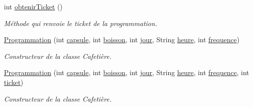 \begin{DoxyCompactItemize}
int \hyperlink{classcom_1_1example_1_1ekawa_1_1_programmation_a63e8701af99c5bd974e028ba53209887}{obtenir\+Ticket} ()
\begin{DoxyCompactList}\small\item\em Méthode qui renvoie le ticket de la programmation. \end{DoxyCompactList}\item 
\hyperlink{classcom_1_1example_1_1ekawa_1_1_programmation_a9119f0bd9f104d0fbccdff1ab1f0eb64}{Programmation} (int \hyperlink{classcom_1_1example_1_1ekawa_1_1_programmation_a97573a66f9b2821a7445c69f346a5298}{capsule}, int \hyperlink{classcom_1_1example_1_1ekawa_1_1_programmation_a625a85ed4d0b16f52382fd458e0e5657}{boisson}, int \hyperlink{classcom_1_1example_1_1ekawa_1_1_programmation_a96605063cb4177fa382b1ce2388f544f}{jour}, String \hyperlink{classcom_1_1example_1_1ekawa_1_1_programmation_abfff674f6cd5f76ea4b8c37e8c558ffa}{heure}, int \hyperlink{classcom_1_1example_1_1ekawa_1_1_programmation_a6d0fd682b51727025ed8c4bf35fc8980}{frequence})
\begin{DoxyCompactList}\small\item\em Constructeur de la classe Cafetière. \end{DoxyCompactList}\item 
\hyperlink{classcom_1_1example_1_1ekawa_1_1_programmation_a06d8594e85da1735683f35228e7e6f8d}{Programmation} (int \hyperlink{classcom_1_1example_1_1ekawa_1_1_programmation_a97573a66f9b2821a7445c69f346a5298}{capsule}, int \hyperlink{classcom_1_1example_1_1ekawa_1_1_programmation_a625a85ed4d0b16f52382fd458e0e5657}{boisson}, int \hyperlink{classcom_1_1example_1_1ekawa_1_1_programmation_a96605063cb4177fa382b1ce2388f544f}{jour}, String \hyperlink{classcom_1_1example_1_1ekawa_1_1_programmation_abfff674f6cd5f76ea4b8c37e8c558ffa}{heure}, int \hyperlink{classcom_1_1example_1_1ekawa_1_1_programmation_a6d0fd682b51727025ed8c4bf35fc8980}{frequence}, int \hyperlink{classcom_1_1example_1_1ekawa_1_1_programmation_a54ce49550025f7f5e5080f0548b08653}{ticket})
\begin{DoxyCompactList}\small\item\em Constructeur de la classe Cafetière. \end{DoxyCompactList}\end{DoxyCompactItemize}
